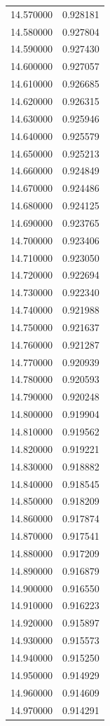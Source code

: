 \begin{tabular}{rr}
14.570000 & 0.928181 \\
14.580000 & 0.927804 \\
14.590000 & 0.927430 \\
14.600000 & 0.927057 \\
14.610000 & 0.926685 \\
14.620000 & 0.926315 \\
14.630000 & 0.925946 \\
14.640000 & 0.925579 \\
14.650000 & 0.925213 \\
14.660000 & 0.924849 \\
14.670000 & 0.924486 \\
14.680000 & 0.924125 \\
14.690000 & 0.923765 \\
14.700000 & 0.923406 \\
14.710000 & 0.923050 \\
14.720000 & 0.922694 \\
14.730000 & 0.922340 \\
14.740000 & 0.921988 \\
14.750000 & 0.921637 \\
14.760000 & 0.921287 \\
14.770000 & 0.920939 \\
14.780000 & 0.920593 \\
14.790000 & 0.920248 \\
14.800000 & 0.919904 \\
14.810000 & 0.919562 \\
14.820000 & 0.919221 \\
14.830000 & 0.918882 \\
14.840000 & 0.918545 \\
14.850000 & 0.918209 \\
14.860000 & 0.917874 \\
14.870000 & 0.917541 \\
14.880000 & 0.917209 \\
14.890000 & 0.916879 \\
14.900000 & 0.916550 \\
14.910000 & 0.916223 \\
14.920000 & 0.915897 \\
14.930000 & 0.915573 \\
14.940000 & 0.915250 \\
14.950000 & 0.914929 \\
14.960000 & 0.914609 \\
14.970000 & 0.914291 \\

\end{tabular}
